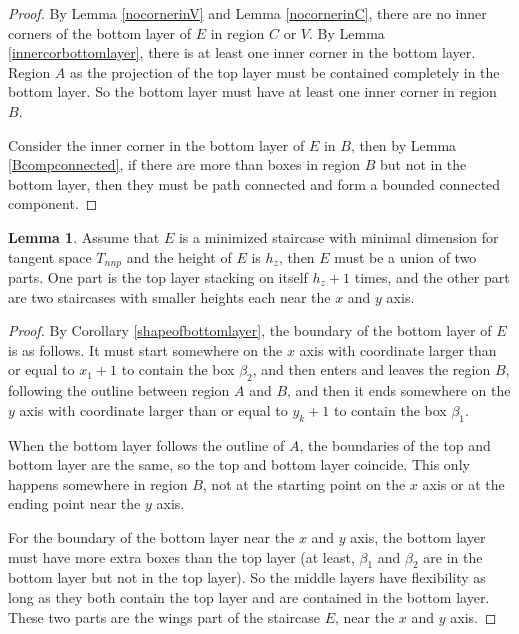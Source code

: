 \documentclass{amsart}[10pt]
\theoremstyle{plain}
\theoremstyle{definition}
\newtheorem{lemma}[theorem]{Lemma}
\begin{document}
\begin{proof}
By Lemma \ref{nocornerinV} and Lemma \ref{nocornerinC}, there are no inner corners of the bottom layer of $E$ in region $C$ or $V$. By Lemma \ref{innercorbottomlayer}, there is at least one inner corner in the bottom layer. Region $A$ as the projection of the top layer must be contained completely in the bottom layer. So the bottom layer must have at least one inner corner in region $B$. 

Consider the inner corner in the bottom layer of $E$ in $B$, then by Lemma \ref{Bcompconnected}, if there are more than boxes in region $B$ but not in the bottom layer, then they must be path connected and form a bounded connected component. 
\end{proof}

\begin{lemma}
Assume that $E$ is a minimized staircase with minimal dimension for tangent space $T_{nnp}$ and the height of $E$ is $h_z$, then $E$ must be a union of two parts. One part is the top layer stacking on itself $h_z+1$ times, and the other part are two staircases with smaller heights each near the $x$ and $y$ axis.
\end{lemma}

\begin{proof}
By Corollary \ref{shapeofbottomlayer}, the boundary of the bottom layer of $E$ is as follows. It must start somewhere on the $x$ axis with coordinate larger than or equal to $x_1+1$ to contain the box $\beta_2$, and then enters and leaves the region $B$, following the outline between region $A$ and $B$, and then it ends somewhere on the $y$ axis with coordinate larger than or equal to $y_k+1$ to contain the box $\beta_1$.

When the bottom layer follows the outline of $A$, the boundaries of the top and bottom layer are the same, so the top and bottom layer coincide. This only happens somewhere in region $B$, not at the starting point on the $x$ axis or at the ending point near the $y$ axis.

For the boundary of the bottom layer near the $x$ and $y$ axis, the bottom layer must have more extra boxes than the top layer (at least, $\beta_1$ and $\beta_2$ are in the bottom layer but not in the top layer). So the middle layers have flexibility as long as they both contain the top layer and are contained in the bottom layer. These two parts are the wings part of the staircase $E$, near the $x$ and $y$ axis.
\end{proof}
\end{document}
